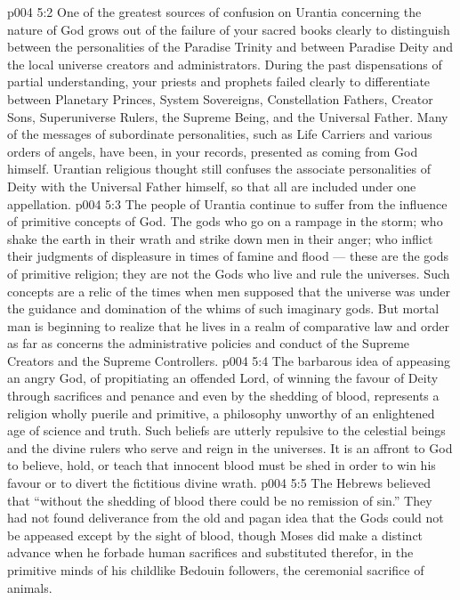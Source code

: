 \vs p004 5:2 One of the greatest sources of confusion on Urantia concerning the nature of God grows out of the failure of your sacred books clearly to distinguish between the personalities of the Paradise Trinity and between Paradise Deity and the local universe creators and administrators. During the past dispensations of partial understanding, your priests and prophets failed clearly to differentiate between Planetary Princes, System Sovereigns, Constellation Fathers, Creator Sons, Superuniverse Rulers, the Supreme Being, and the Universal Father. Many of the messages of subordinate personalities, such as Life Carriers and various orders of angels, have been, in your records, presented as coming from God himself. Urantian religious thought still confuses the associate personalities of Deity with the Universal Father himself, so that all are included under one appellation.
\vs p004 5:3 \pc The people of Urantia continue to suffer from the influence of primitive concepts of God. The gods who go on a rampage in the storm; who shake the earth in their wrath and strike down men in their anger; who inflict their judgments of displeasure in times of famine and flood --- these are the gods of primitive religion; they are not the Gods who live and rule the universes. Such concepts are a relic of the times when men supposed that the universe was under the guidance and domination of the whims of such imaginary gods. But mortal man is beginning to realize that he lives in a realm of comparative law and order as far as concerns the administrative policies and conduct of the Supreme Creators and the Supreme Controllers.
\vs p004 5:4 \pc The barbarous idea of appeasing an angry God, of propitiating an offended Lord, of winning the favour of Deity through sacrifices and penance and even by the shedding of blood, represents a religion wholly puerile and primitive, a philosophy unworthy of an enlightened age of science and truth. Such beliefs are utterly repulsive to the celestial beings and the divine rulers who serve and reign in the universes. It is an affront to God to believe, hold, or teach that innocent blood must be shed in order to win his favour or to divert the fictitious divine wrath.
\vs p004 5:5 The Hebrews believed that “without the shedding of blood there could be no remission of sin.” They had not found deliverance from the old and pagan idea that the Gods could not be appeased except by the sight of blood, though Moses did make a distinct advance when he forbade human sacrifices and substituted therefor, in the primitive minds of his childlike Bedouin followers, the ceremonial sacrifice of animals.
